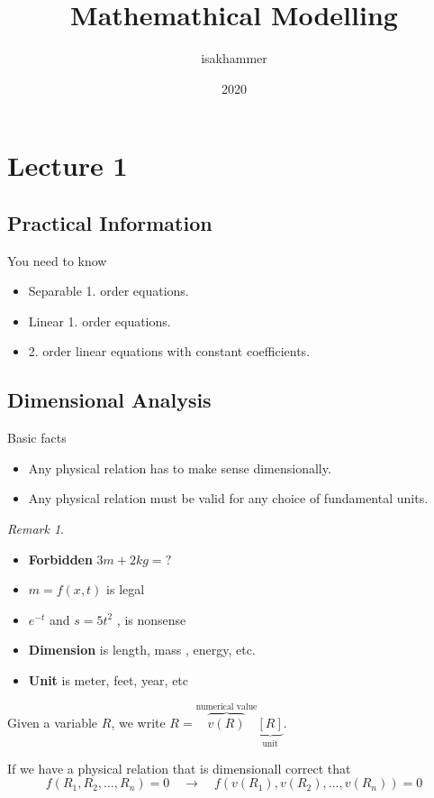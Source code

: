 \documentclass{article}
\title{Mathemathical Modelling}
\author{isakhammer }
\date{2020}
\theoremstyle{remark}
\newtheorem*{remark}{Remark}
\begin{document}
\maketitle
\tableofcontents
\newpage
\newpage
\section{Lecture 1}%
\label{sec:lecture_1}

\subsection{Practical Information}%
\label{sub:practical_information}

You need to know 
\begin{itemize}
  \item Separable 1. order equations.
  \item Linear 1. order equations.
  \item 2. order linear equations with constant coefficients.
\end{itemize}

\subsection{Dimensional Analysis}%
\label{sub:dimensional_analysis}

Basic facts
\begin{itemize}
  \item Any physical relation has to make sense dimensionally.
  \item Any physical relation must be valid for any choice of fundamental units.
\end{itemize}
\begin{remark}
  \begin{itemize}
    \item
  \textbf{Forbidden} $3m + 2kg = ?$ 
\item $m = f\left( x,t \right)$ is legal
\item  $e^{-t}$ and $s = 5t ^{2}$ , is nonsense
  \end{itemize}
\end{remark}

\begin{itemize}
  \item
\textbf{Dimension}  is length, mass , energy, etc.
\item
\textbf{Unit} is meter, feet, year, etc
\end{itemize}
Given a variable $R$, we write $R =\overbrace{v\left( R \right)}^\text{numerical value}   \underbrace{\left[ R \right]}_\text{unit}$.   
\par
If we have a physical relation that is dimensionall correct that \[
f\left( R_{1}, R_{2}, \ldots, R_{n} \right) = 0 \quad  \to \quad f\left( v\left( R_{1} \right), v\left( R_{2} \right), \ldots, v\left( R_n \right) \right)   = 0
\] 
\end{document}
